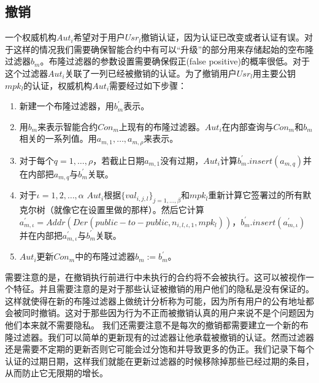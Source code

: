 \documentclass[UTF8]{ctexart}
\begin{document}
\subsection{撤销}
一个权威机构$Aut_i$希望对于用户$Usr_l$撤销认证，因为认证已改变或者认证有误。对于这样的情况我们需要确保智能合约中有可以“升级”的部分用来存储起始的空布隆过滤器$b_m$。布隆过滤器的参数设置需要确保假正(false positive)的概率很低。对于这个过滤器$Aut_i$关联了一列已经被撤销的认证。为了撤销用户$Usr_l$用主要公钥$mpk_l$的认证，权威机构$Aut_i$需要经过如下步骤：
\begin{enumerate}
\item 新建一个布隆过滤器，用$b^{'}_m$表示。
\item 用$b_m$来表示智能合约$Con_m$上现有的布隆过滤器。$Aut_i$在内部查询与$Con_m$和$b_m$相关的一系列值。用$a_{m, 1}, \ldots, a_{m, \rho}$来表示。
\item 对于每个$q = 1, \ldots, \rho$，若截止日期$a_{m, 1}$没有过期，$Aut_i$计算$b^{'}_m.insert(a_{m, q})$并在内部把$a_{m, q}$与$b^{'}_m$关联。
\item 对于$\iota = 1, 2, \ldots, \alpha$ $Aut_i$根据$\{val_{i,j,l}\}_{j = 1, \ldots, \beta}$和$mpk_l$重新计算它签署过的所有默克尔树（就像它在设置里做的那样）。然后它计算$a^{'}_{m, \iota} = Addr(Der(public-to-public, n_{i, l, \iota, 1}, mpk_l))$，$b^{'}_m.insert(a^{'}_{m, \iota})$并在内部把$a^{'}_{m, \iota}$与$b^{'}_m$关联。
\item $Aut_i$更新$Con_m$中的布隆过滤器$b_m := b^{'}_m$。
\end{enumerate}
需要注意的是，在撤销执行前进行中未执行的合约将不会被执行。这可以被视作一个特征。并且需要注意的是对于那些认证被撤销的用户他们的隐私是没有保证的。这样就使得在新的布隆过滤器上做统计分析称为可能，因为所有用户的公有地址都会被同时撤销。这对于那些因为行为不正而被撤销认真的用户来说不是个问题因为他们本来就不需要隐私。
我们还需要注意不是每次的撤销都需要建立一个新的布隆过滤器。我们可以简单的更新现有的过滤器让他承载被撤销的认证。然而过滤器还是需要不定期的更新否则它可能会过分饱和并导致更多的伪正。我们记录下每个认证的过期日期，这样我们就能在更新过滤器的时候移除掉那些已经过期的条目，从而防止它无限期的增长。
\end{document}
